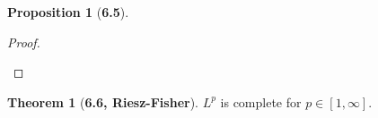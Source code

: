 \documentclass[12pt]{article}
\theoremstyle{definition}
\newtheorem*{thm}{Theorem}
\newtheorem*{prop}{Proposition}
\begin{document}
\begin{prop}[\textbf{6.5}]
\begin{proof}
\begin{enumerate}
            \end{enumerate}
    \end{proof}
    
\end{prop}

\begin{thm}[\textbf{6.6, Riesz-Fisher}]

    \( L^p \) is complete for \( p \in [1, \infty] \).
    
\end{thm}
\end{document}
